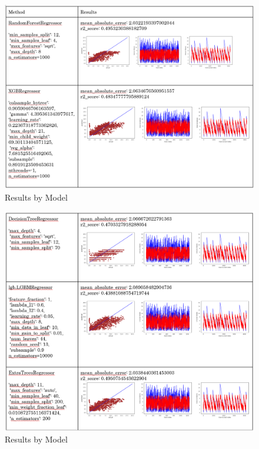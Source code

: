 \documentclass[]{llncs}
\begin{document}
\begin{figure}
	\centering
	\includegraphics[width=1\linewidth]{../GPUProject/Results1.PNG}
	\caption{Results by Model}
	\label{fig:morethan90percent}
\end{figure}

\begin{figure}
	\centering
	\includegraphics[width=1\linewidth]{../GPUProject/Results2.PNG}
	\caption{Results by Model}
	\label{fig:morethan90percent}
\end{figure}
\end{document}
